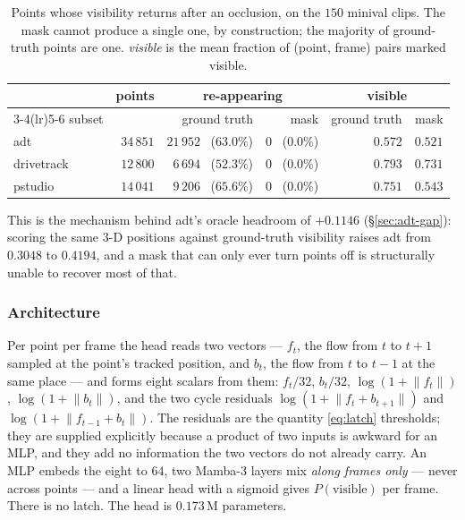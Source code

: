 \documentclass[11pt,a4paper]{article}
\begin{document}
\begin{table}[h]
\centering
\caption{Points whose visibility returns after an occlusion, on the $150$ minival clips. The mask
cannot produce a single one, by construction; the majority of ground-truth points are one.
\emph{visible} is the mean fraction of (point, frame) pairs marked visible.}
\label{tab:reappear}
\begin{tabular}{lrrrrr}
\toprule
 & points & \multicolumn{2}{c}{re-appearing} & \multicolumn{2}{c}{visible} \\
\cmidrule(lr){3-4}\cmidrule(lr){5-6}
subset & & ground truth & mask & ground truth & mask \\
\midrule
adt        & $34\,851$ & $21\,952$ \ ($63.0\%$) & $0$ \ ($0.0\%$) & $0.572$ & $0.521$ \\
drivetrack & $12\,800$ & $6\,694$ \ ($52.3\%$)  & $0$ \ ($0.0\%$) & $0.793$ & $0.731$ \\
pstudio    & $14\,041$ & $9\,206$ \ ($65.6\%$)  & $0$ \ ($0.0\%$) & $0.751$ & $0.543$ \\
\bottomrule
\end{tabular}
\end{table}

This is the mechanism behind adt's oracle headroom of $+0.1146$ (\S\ref{sec:adt-gap}): scoring the
same 3-D positions against ground-truth visibility raises adt from $0.3048$ to $0.4194$, and a
mask that can only ever turn points off is structurally unable to recover most of that.

\subsubsection{Architecture}
Per point per frame the head reads two vectors --- $f_t$, the flow from $t$ to $t+1$ sampled at
the point's tracked position, and $b_t$, the flow from $t$ to $t-1$ at the same place --- and
forms eight scalars from them: $f_t/32$, $b_t/32$, $\log(1+\lVert f_t\rVert)$,
$\log(1+\lVert b_t\rVert)$, and the two cycle residuals $\log(1+\lVert f_t+b_{t+1}\rVert)$ and
$\log(1+\lVert f_{t-1}+b_t\rVert)$. The residuals are the quantity \eqref{eq:latch} thresholds;
they are supplied explicitly because a product of two inputs is awkward for an MLP, and they add
no information the two vectors do not already carry. An MLP embeds the eight to $64$, two
Mamba-3 layers mix \emph{along frames only} --- never across points --- and a linear head with a
sigmoid gives $P(\text{visible})$ per frame. There is no latch. The head is $0.173$\,M parameters.
\end{document}
